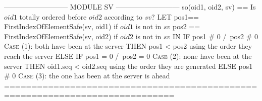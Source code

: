 \documentclass[preview, border={5pt 0pt 5pt 1pt}]{standalone}
\begin{document}
\begin{tla}
--------------------------- MODULE SV ---------------------------
so(oid1, oid2, sv) == \* Is $oid1$ totally ordered before $oid2$ according to $sv$?
    LET  pos1== FirstIndexOfElementSafe(sv, oid1)  if $oid1$ is not in $sv$
        pos2 == FirstIndexOfElementSafe(sv, oid2)  if $oid2$ is not in $sv$
    IN  IF pos1 # 0 /\ pos2 # 0 \* \textsc{Case} (1): both have been at the server
        THEN pos1 < pos2        \* using the order they reach the server
        ELSE IF pos1 = 0 /\ pos2 = 0  \* \textsc{Case} (2): none have been at the server
             THEN oid1.seq < oid2.seq \* using the order they are generated
             ELSE pos1 # 0 \* \textsc{Case} (3): the one has been at the server is ahead
=============================================================================
\end{tla}
\begin{tlatex}
\@x{}\moduleLeftDash{}\moduleRightDash\@xx{}%
%
%
\@xx{}%
%
\@xx{}%
%
%
\@xx{}%
%
\@xx{}%
%
%
\@xx{}%
%
%
\@xx{}%
%
%
\@xx{}%
%
%
\@xx{}%
\@x{}\bottombar\@xx{}%
\end{tlatex}
\end{document}
